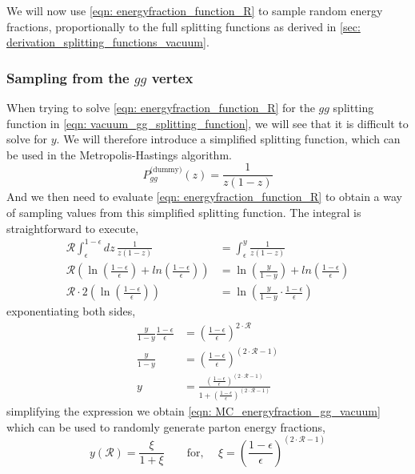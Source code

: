 \documentclass[main.tex]{subfiles}
\begin{document}
We will now use \autoref{eqn: energyfraction_function_R} to sample random energy fractions, proportionally to the full splitting functions as derived in \autoref{sec: derivation_splitting_functions_vacuum}.

\subsubsection*{Sampling from the \(gg\) vertex}
When trying to solve \autoref{eqn: energyfraction_function_R} for the \(gg\) splitting function in \autoref{eqn: vacuum_gg_splitting_function}, we will see that it is difficult to solve for \(y\). We will therefore introduce a simplified splitting function, which can be used in the Metropolis-Hastings algorithm.
\begin{equation}\label{eqn: p_ggg_vacuum_dummy}
    P_{gg}^{\text{(dummy)}}(z) = \frac{1}{z(1-z)}
\end{equation}
And we then need to evaluate \autoref{eqn: energyfraction_function_R} to obtain a way of sampling values from this simplified splitting function. The integral is straightforward to execute,
\begin{align}
    \mathcal{R} \int_\epsilon^{1-\epsilon} dz \, \frac{1}{z(1-z)} &= \int_\epsilon^{y} \frac{1}{z(1-z)}  \nonumber\\
    \mathcal{R} \left(  \ln (\frac{1-\epsilon}{\epsilon}) + ln(\frac{1-\epsilon}{\epsilon}) \right) &= \ln (\frac{y}{1-y}) + ln(\frac{1-\epsilon}{\epsilon}) \nonumber\\
    \mathcal{R} \cdot 2 \left( \ln (\frac{1-\epsilon}{\epsilon}) \right) &= \ln (\frac{y}{1-y} \cdot \frac{1-\epsilon}{\epsilon})
\end{align}
exponentiating both sides, 
\begin{align}\label{eqn: MC_energyfraction_origin_vacuum}
    \frac{y}{1-y} \frac{1-\epsilon}{\epsilon} &= \left(\frac{1-\epsilon}{\epsilon}\right)^{2\cdot \mathcal{R}} \nonumber\\
    \frac{y}{1-y} &= \left(\frac{1-\epsilon}{\epsilon}\right)^{(2\cdot \mathcal{R}-1)} \nonumber\\
    y &= \frac{\left(\frac{1-\epsilon}{\epsilon}\right)^{(2\cdot \mathcal{R}-1)}}{1+\left(\frac{1-\epsilon}{\epsilon}\right)^{(2\cdot \mathcal{R}-1)}}
\end{align}
simplifying the expression we obtain \autoref{eqn: MC_energyfraction_gg_vacuum} which can be used to randomly generate parton energy fractions, 
\begin{equation}\label{eqn: MC_energyfraction_gg_vacuum}
    y(\mathcal{R}) = \frac{\xi}{1+ \xi} \qquad \text{for, } \quad \xi = \left(\frac{1-\epsilon}{\epsilon}\right)^{(2\cdot \mathcal{R}-1)}
\end{equation}
\end{document}
